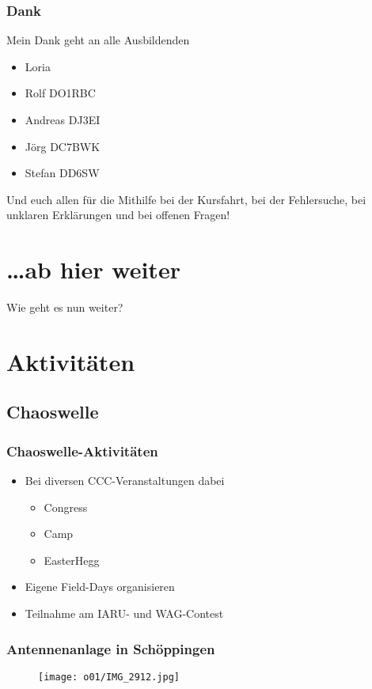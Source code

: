 \begin{frame}
  \frametitle{Dank}
  Mein Dank geht an alle Ausbildenden
  \begin{itemize}
    \item Loria
    \item Rolf DO1RBC
    \item Andreas DJ3EI
    \item Jörg DC7BWK
    \item Stefan DD6SW
  \end{itemize}
  \pause
  \vspace{3em}
  {\Large Und euch allen für die Mithilfe bei der Kursfahrt, bei der Fehlersuche, bei unklaren Erklärungen und bei offenen Fragen!}
\end{frame}


\section{\ldots ab hier weiter}
\begin{frame}
  \begin{center}
    {\Huge Wie geht es nun weiter?}
  \end{center}
\end{frame}

\section{Aktivitäten}
\subsection{Chaoswelle}
\begin{frame}
  \frametitle{Chaoswelle-Aktivitäten}
  \begin{itemize}
    \item Bei diversen CCC-Veranstaltungen dabei
      \begin{itemize}
        \item Congress
        \item Camp 
        \item EasterHegg 
      \end{itemize}
    \item Eigene Field-Days organisieren
    \item Teilnahme am IARU- und WAG-Contest 
  \end{itemize}
\end{frame}

\begin{frame}
  \frametitle{Antennenanlage in Schöppingen}
  \begin{center}
    \begin{figure}
      \texttt{[image: o01/IMG\_2912.jpg]}
    \end{figure}
  \end{center}
\end{frame}

